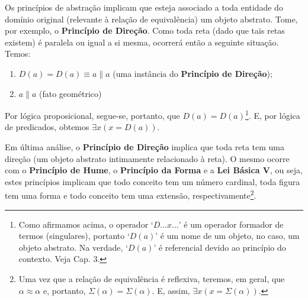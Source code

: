 Os princípios de abstração implicam que esteja associado a toda entidade
do domínio original (relevante à relação de equivalência) um objeto
abstrato. Tome, por exemplo, o \textbf{Princípio de Direção}. Como
toda reta (dado que tais retas existem) é paralela ou igual a si mesma,
ocorrerá então a seguinte situação. Temos: 
\begin{enumerate}
\item $D(a)=D(a)\equiv a\parallel a$ (uma instância do \textbf{Princípio
de Direção});
\item $a\parallel a$ (fato geométrico)
\end{enumerate}
Por lógica proposicional, segue-se, portanto, que $D(a)=D(a)$\footnote{Como afirmamos acima, o operador `$D...x...$' é um operador formador
de termos (singulares), portanto `$D(a)$' é um nome de um objeto,
no caso, um objeto abstrato. Na verdade, `$D(a)$' é referencial devido
ao princípio do contexto. Veja Cap. 3.}. E, por lógica de predicados, obtemos $\exists x(x=D(a))$.

Em última análise, o \textbf{Princípio de Direção} implica que toda
reta tem uma direção (um objeto abstrato intimamente relacionado à
reta). O mesmo ocorre com o \textbf{Princípio de Hume}, o \textbf{Princípio
da Forma} e a \textbf{Lei Básica V}, ou seja, estes princípios implicam
que todo conceito tem um número cardinal, toda figura tem uma forma
e todo conceito tem uma extensão, respectivamente\footnote{Uma vez que a relação de equivalência é reflexiva, teremos, em geral,
que $\alpha\approx\alpha$ e, portanto, $\Sigma(\alpha)=\Sigma(\alpha)$.
E, assim, $\exists x(x=\Sigma(\alpha))$.}.
